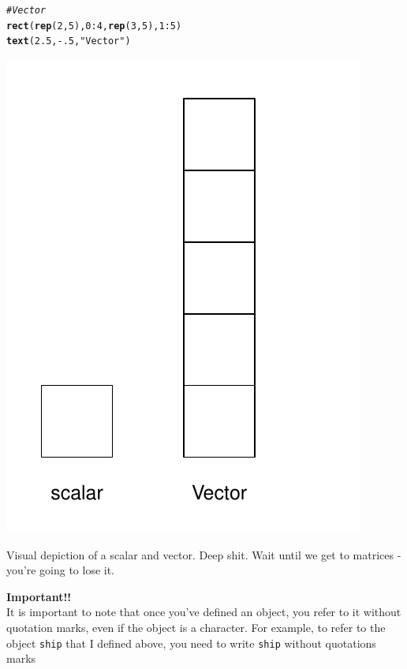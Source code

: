 \documentclass{tufte-book}\usepackage[]{graphicx}\usepackage[]{color}
\makeatletter
\def\maxwidth{ %
  \ifdim\Gin@nat@width>\linewidth
    \linewidth
  \else
    \Gin@nat@width
  \fi
}
\newcommand{\hlnum}[1]{\textcolor[rgb]{0.686,0.059,0.569}{#1}}%
\newcommand{\hlstr}[1]{\textcolor[rgb]{0.192,0.494,0.8}{#1}}%
\newcommand{\hlcom}[1]{\textcolor[rgb]{0.678,0.584,0.686}{\textit{#1}}}%
\newcommand{\hlopt}[1]{\textcolor[rgb]{0,0,0}{#1}}%
\newcommand{\hlstd}[1]{\textcolor[rgb]{0.345,0.345,0.345}{#1}}%
\newcommand{\hlkwd}[1]{\textcolor[rgb]{0.737,0.353,0.396}{\textbf{#1}}}%
\newenvironment{kframe}{%
 \def\at@end@of@kframe{}%
 \ifinner\ifhmode%
  \def\at@end@of@kframe{\end{minipage}}%
  \begin{minipage}{\columnwidth}%
 \fi\fi%
 \def\FrameCommand##1{\hskip\@totalleftmargin \hskip-\fboxsep
 \colorbox{shadecolor}{##1}\hskip-\fboxsep
     \hskip-\linewidth \hskip-\@totalleftmargin \hskip\columnwidth}%
 \MakeFramed {\advance\hsize-\width
   \@totalleftmargin\z@ \linewidth\hsize
   \@setminipage}}%
 {\par\unskip\endMakeFramed%
 \at@end@of@kframe}
\newenvironment{knitrout}{}{} %
\makeatother
\begin{document}
\begin{marginfigure}
\begin{tiny}
\begin{knitrout}
\begin{kframe}
\begin{alltt}
\hlcom{# Vector}
\hlkwd{rect}\hlstd{(}\hlkwd{rep}\hlstd{(}\hlnum{2}\hlstd{,} \hlnum{5}\hlstd{),} \hlnum{0}\hlopt{:}\hlnum{4}\hlstd{,} \hlkwd{rep}\hlstd{(}\hlnum{3}\hlstd{,} \hlnum{5}\hlstd{),} \hlnum{1}\hlopt{:}\hlnum{5}\hlstd{)}
\hlkwd{text}\hlstd{(}\hlnum{2.5}\hlstd{,} \hlopt{-}\hlnum{.5}\hlstd{,} \hlstr{"Vector"}\hlstd{)}
\end{alltt}
\end{kframe}
\includegraphics[width=\maxwidth]{figure/unnamed-chunk-20-1} 

\end{knitrout}
\caption{Visual depiction of a scalar and vector. Deep shit. Wait until we get to matrices - you're going to lose it.}
\label{fig:scalarvector}
\end{tiny}
\end{marginfigure}

\textbf{Important!!} \\

It is important to note that once you've defined an object, you refer to it without quotation marks, even if the object is a character. For example, to refer to the object \texttt{ship} that I defined above, you need to write \texttt{ship} without quotations marks
\end{document}
